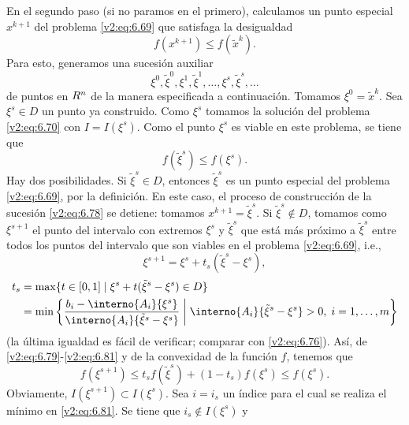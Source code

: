 En el segundo paso (si no paramos en el primero), calculamos un punto especial $x^{k+1}$ del problema \eqref{v2:eq:6.69} que satisfaga la desigualdad
\begin{equation}
    f(x^{k+1}) \le f(\tilde{x}^k).
    \label{v2:eq:6.77}
\end{equation}
Para esto, generamos una sucesión auxiliar
\begin{equation}
    \xi^0, \tilde{\xi}^0, \xi^1, \tilde{\xi}^1, \dots, \xi^s, \tilde{\xi}^s, \dots
    \label{v2:eq:6.78}
\end{equation}
de puntos en $R^n$ de la manera especificada a continuación.
Tomamos $\xi^0 = \tilde{x}^k$. Sea $\xi^s \in D$ un punto ya construido. Como $\xi^s$ tomamos la solución del problema \eqref{v2:eq:6.70} con $I = I(\xi^s)$. Como el punto $\xi^s$ es viable en este problema, se tiene que
\begin{equation}
    f(\tilde{\xi}^s) \le f(\xi^s).
    \label{v2:eq:6.79}
\end{equation}
Hay dos posibilidades.
Si $\tilde{\xi}^s \in D$, entonces $\tilde{\xi}^s$ es un punto especial del problema \eqref{v2:eq:6.69}, por la definición. En este caso, el proceso de construcción de la sucesión \eqref{v2:eq:6.78} se detiene: tomamos $x^{k+1} = \tilde{\xi}^s$.
Si $\tilde{\xi}^s \notin D$, tomamos como $\xi^{s+1}$ el punto del intervalo con extremos $\xi^s$ y $\tilde{\xi}^s$ que está más próximo a $\tilde{\xi}^s$ entre todos los puntos del intervalo que son viables en el problema \eqref{v2:eq:6.69}, i.e.,
\begin{equation}
    \xi^{s+1} = \xi^s + t_s (\tilde{\xi}^s - \xi^s),
    \label{v2:eq:6.80}
\end{equation}
\begin{align}
    t_s &= \max \{ t \in [0, 1] \mid \xi^s + t(\tilde{\xi}^s - \xi^s) \in D \} \nonumber \\
    &= \min \left\{ \frac{b_i - \interno{A_i}{\xi^s}}{\interno{A_i}{\tilde{\xi}^s - \xi^s}} \;\middle|\; \interno{A_i}{\tilde{\xi}^s - \xi^s} > 0, \; i = 1, \dots, m \right\}
    \label{v2:eq:6.81}
\end{align}
(la última igualdad es fácil de verificar; comparar con \eqref{v2:eq:6.76}). Así, de \eqref{v2:eq:6.79}-\eqref{v2:eq:6.81} y de la convexidad de la función $f$, tenemos que
\begin{equation}
    f(\xi^{s+1}) \le t_s f(\tilde{\xi}^s) + (1 - t_s) f(\xi^s) \le f(\xi^s).
    \label{v2:eq:6.82}
\end{equation}
Obviamente, $I(\xi^{s+1}) \subset I(\xi^s)$. Sea $i = i_s$ un índice para el cual se realiza el mínimo en \eqref{v2:eq:6.81}. Se tiene que $i_s \notin I(\xi^s)$ y
